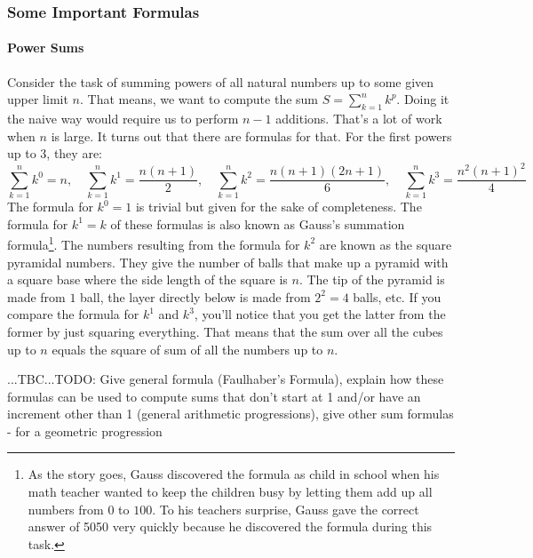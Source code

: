 


\subsubsection{Some Important Formulas}

\paragraph{Power Sums}
Consider the task of summing powers of all natural numbers up to some given upper limit $n$. That means, we want to compute the sum $S = \sum_{k=1}^{n} k^p$. Doing it the naive way would require us to perform $n-1$ additions. That's a lot of work when $n$ is large. It turns out that there are formulas for that. For the first powers up to 3, they are:
\begin{equation}
\sum_{k=1}^{n} k^0 = n, \quad
\sum_{k=1}^{n} k^1 = \frac{n (n+1)}{2}, \quad
\sum_{k=1}^{n} k^2 = \frac{n (n+1) (2 n  + 1) }{6}, \quad
\sum_{k=1}^{n} k^3 = \frac{n^2 (n+1)^2}{4}
\end{equation}
The formula for $k^0 = 1$ is trivial but given for the sake of completeness. The formula for $k^1 = k$ of these formulas is also known as Gauss's summation formula\footnote{As the story goes, Gauss discovered the formula as child in school when his math teacher wanted to keep the children busy by letting them add up all numbers from $0$ to $100$. To his teachers surprise, Gauss gave the correct answer of 5050 very quickly because he discovered the formula during this task.}. The numbers resulting from the formula for $k^2$ are known as the square pyramidal numbers. They give the number of balls that make up a pyramid with a square base where the side length of the square is $n$. The tip of the pyramid is made from $1$ ball, the layer directly below is made from $2^2 = 4$ balls, etc. If you compare the formula for $k^1$ and $k^3$, you'll notice that you get the latter from the former by just squaring everything. That means that the sum over all the cubes up to $n$ equals the square of sum of all the numbers up to $n$.

...TBC...TODO: Give general formula (Faulhaber's Formula), explain how these formulas can be used to compute sums that don't start at 1 and/or have an increment other than 1 (general arithmetic progressions), give other sum formulas - for a geometric progression

